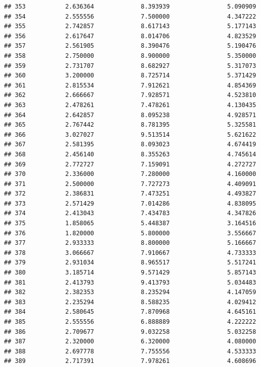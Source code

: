 \documentclass[]{article}
\begin{document}
\begin{verbatim}
## 353           2.636364             8.393939                5.090909
## 354           2.555556             7.500000                4.347222
## 355           2.742857             8.617143                5.177143
## 356           2.617647             8.014706                4.823529
## 357           2.561905             8.390476                5.190476
## 358           2.750000             8.900000                5.350000
## 359           2.731707             8.682927                5.317073
## 360           3.200000             8.725714                5.371429
## 361           2.815534             7.912621                4.854369
## 362           2.666667             7.928571                4.523810
## 363           2.478261             7.478261                4.130435
## 364           2.642857             8.095238                4.928571
## 365           2.767442             8.781395                5.325581
## 366           3.027027             9.513514                5.621622
## 367           2.581395             8.093023                4.674419
## 368           2.456140             8.355263                4.745614
## 369           2.772727             7.159091                4.272727
## 370           2.336000             7.280000                4.160000
## 371           2.500000             7.727273                4.409091
## 372           2.386831             7.473251                4.493827
## 373           2.571429             7.014286                4.838095
## 374           2.413043             7.434783                4.347826
## 375           1.858065             5.448387                3.164516
## 376           1.820000             5.800000                3.556667
## 377           2.933333             8.800000                5.166667
## 378           3.066667             7.910667                4.733333
## 379           2.931034             8.965517                5.517241
## 380           3.185714             9.571429                5.857143
## 381           2.413793             9.413793                5.034483
## 382           2.382353             8.235294                4.147059
## 383           2.235294             8.588235                4.029412
## 384           2.580645             7.870968                4.645161
## 385           2.555556             6.888889                4.222222
## 386           2.709677             9.032258                5.032258
## 387           2.320000             6.320000                4.080000
## 388           2.697778             7.755556                4.533333
## 389           2.717391             7.978261                4.608696

\end{verbatim}
\end{document}
